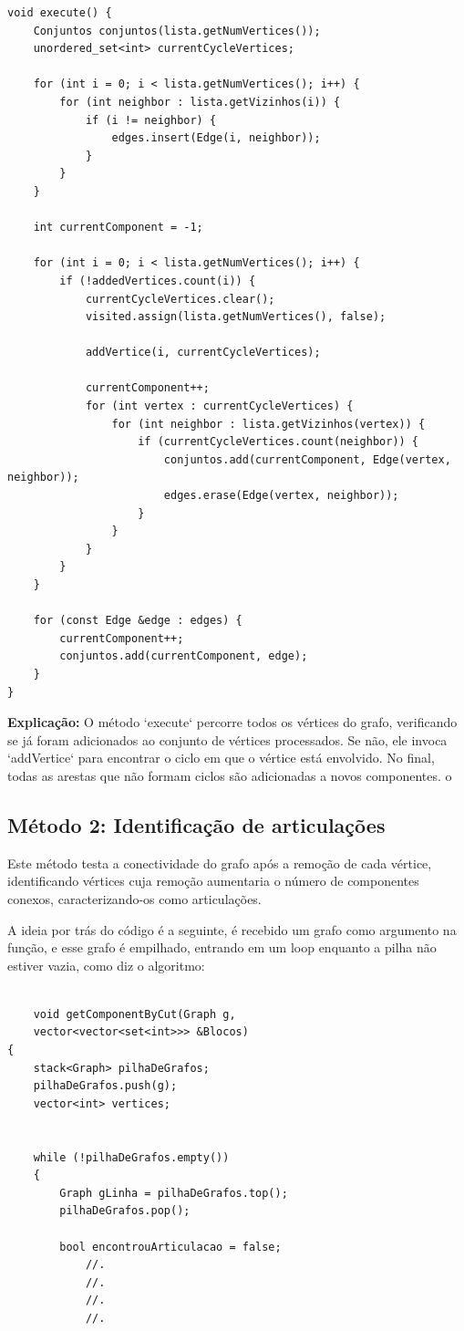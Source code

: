 \documentclass[10pt,conference]{IEEEtran}
\begin{document}
\begin{lstlisting}
void execute() {
    Conjuntos conjuntos(lista.getNumVertices());
    unordered_set<int> currentCycleVertices;

    for (int i = 0; i < lista.getNumVertices(); i++) {
        for (int neighbor : lista.getVizinhos(i)) {
            if (i != neighbor) {
                edges.insert(Edge(i, neighbor));
            }
        }
    }

    int currentComponent = -1;

    for (int i = 0; i < lista.getNumVertices(); i++) {
        if (!addedVertices.count(i)) {
            currentCycleVertices.clear();
            visited.assign(lista.getNumVertices(), false);

            addVertice(i, currentCycleVertices);

            currentComponent++;
            for (int vertex : currentCycleVertices) {
                for (int neighbor : lista.getVizinhos(vertex)) {
                    if (currentCycleVertices.count(neighbor)) {
                        conjuntos.add(currentComponent, Edge(vertex, neighbor));
                        edges.erase(Edge(vertex, neighbor));
                    }
                }
            }
        }
    }

    for (const Edge &edge : edges) {
        currentComponent++;
        conjuntos.add(currentComponent, edge);
    }
}
\end{lstlisting}

\textbf{Explicação:} O método `execute` percorre todos os vértices do grafo, verificando se já foram adicionados ao conjunto de vértices processados. Se não, ele invoca `addVertice` para encontrar o ciclo em que o vértice está envolvido. No final, todas as arestas que não formam ciclos são adicionadas a novos componentes.
o

\subsection{Método 2: Identificação de articulações}
Este método testa a conectividade do grafo após a remoção de cada vértice, identificando vértices cuja remoção aumentaria o número de componentes conexos, caracterizando-os como articulações.

A ideia por trás do código é a seguinte, é recebido um grafo como argumento na função, e esse grafo é empilhado, entrando em um loop enquanto a pilha não estiver vazia, como diz o algoritmo: \begin{lstlisting}
    
    void getComponentByCut(Graph g, 
    vector<vector<set<int>>> &Blocos)
{
    stack<Graph> pilhaDeGrafos;
    pilhaDeGrafos.push(g); 
    vector<int> vertices;  

  
    while (!pilhaDeGrafos.empty())
    {
        Graph gLinha = pilhaDeGrafos.top();
        pilhaDeGrafos.pop();                

        bool encontrouArticulacao = false;
            //.
            //.
            //.
            //.
\end{lstlisting}
\end{document}
